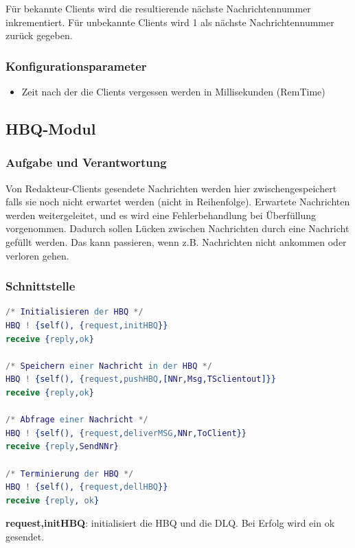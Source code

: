 \documentclass{article}
\begin{document}
Für bekannte Clients wird die resultierende nächste Nachrichtennummer inkrementiert. Für unbekannte Clients wird 1 als nächste Nachrichtennummer zurück gegeben.

\subsubsection{Konfigurationsparameter}
\begin{itemize}
    \item Zeit nach der die Clients vergessen werden in Millisekunden (RemTime)
\end{itemize}

\newpage
			
\subsection{HBQ-Modul}
\subsubsection{Aufgabe und Verantwortung}

Von Redakteur-Clients gesendete Nachrichten werden hier zwischengespeichert falls sie noch nicht
erwartet werden (nicht in Reihenfolge). Erwartete Nachrichten werden weitergeleitet, und es wird eine Fehlerbehandlung
bei Überfüllung vorgenommen. Dadurch sollen Lücken zwischen Nachrichten durch eine Nachricht gefüllt werden. Das kann
passieren, wenn z.B. Nachrichten nicht ankommen oder verloren gehen.

\subsubsection{Schnittstelle}
\begin{lstlisting}[language=Erlang]
/* Initialisieren der HBQ */
HBQ ! {self(), {request,initHBQ}}
receive {reply,ok}

/* Speichern einer Nachricht in der HBQ */
HBQ ! {self(), {request,pushHBQ,[NNr,Msg,TSclientout]}}
receive {reply,ok}

/* Abfrage einer Nachricht */
HBQ ! {self(), {request,deliverMSG,NNr,ToClient}}
receive {reply,SendNNr}

/* Terminierung der HBQ */
HBQ ! {self(), {request,dellHBQ}}
receive {reply, ok}
\end{lstlisting}

\textbf{{request,initHBQ}}: initialisiert die HBQ und die DLQ. Bei Erfolg wird ein ok gesendet.\\
\end{document}
